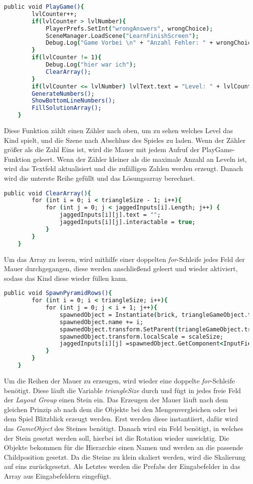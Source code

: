 \begin{lstlisting}[language=csh, caption={Triangle.cs PlayGame-Funktion}]
	public void PlayGame(){
		lvlCounter++;
		if(lvlCounter > lvlNumber){
			PlayerPrefs.SetInt("wrongAnswers", wrongChoice);
			SceneManager.LoadScene("LearnFinishScreen");
			Debug.Log("Game Vorbei \n" + "Anzahl Fehler: " + wrongChoice);
		}
		if(lvlCounter != 1){
			Debug.Log("hier war ich");
			ClearArray();
		}
		if(lvlCounter <= lvlNumber)	lvlText.text = "Level: " + lvlCounter + "/" + lvlNumber;
		GenerateNumbers();
		ShowBottomLineNumbers();
		FillSolutionArray();
	}
\end{lstlisting}
Diese Funktion zählt einen Zähler nach oben, um zu sehen welches Level das Kind spielt, und die Szene nach Abschluss des Spieles zu laden. Wenn der Zähler größer als die Zahl Eins ist, wird die Mauer mit jedem Aufruf der PlayGame-Funktion geleert. Wenn der Zähler kleiner als die maximale Anzahl an Leveln ist, wird das Textfeld aktualisiert und die zufälligen Zahlen werden erzeugt. Danach wird die unterste Reihe gefüllt und das Lösungsarray berechnet.
\begin{lstlisting}[language=csh, caption={Triangle.cs ClearArray-Funktion}]
	public void ClearArray(){
		for (int i = 0; i < triangleSize - 1; i++){
			for (int j = 0; j < jaggedInputs[i].Length; j++) {
				jaggedInputs[i][j].text = "";
				jaggedInputs[i][j].interactable = true;
			}
		}
	}
\end{lstlisting}
Um das Array zu leeren, wird mithilfe einer doppelten \textit{for}-Schleife jedes Feld der Mauer durchgegangen, diese werden anschließend geleert und wieder aktiviert, sodass das Kind diese wieder füllen kann.\\
\begin{lstlisting}[language=csh, caption={Triangle.cs SpawnPyramidRows-Funktion}]
	public void SpawnPyramidRows(){
		for (int i = 0; i < triangleSize; i++){
			for (int j = 0; j < i + 1; j++){
				spawnedObject = Instantiate(brick, triangleGameObject.transform.position, Quaternion.identity);
				spawnedObject.name += i;
				spawnedObject.transform.SetParent(triangleGameObject.transform.GetChild(i));
				spawnedObject.transform.localScale = scaleSize;
				jaggedInputs[i][j] =spawnedObject.GetComponent<InputField>();
			}
		}
	}
\end{lstlisting}
Um die Reihen der Mauer zu erzeugen, wird wieder eine doppelte \textit{for}-Schleife benötigt. Diese läuft die Variable \textit{triangleSize} durch und fügt in jedes freie Feld der \textit{Layout Group} einen Stein ein. Das Erzeugen der Mauer läuft nach dem gleichen Prinzip ab nach dem die Objekte bei den Mengenvergleichen oder bei dem Spiel Blitzblick erzeugt werden. Erst werden diese instantiiert, dafür wird das \textit{GameObject} des Steines benötigt. Danach wird ein Feld benötigt, in welches der Stein gesetzt werden soll, hierbei ist die Rotation wieder unwichtig. Die Objekte bekommen für die Hierarchie einen Namen und werden an die passende Childposition gesetzt. Da die Steine zu klein skaliert werden, wird die Skalierung auf eins zurückgesetzt. Als Letztes werden die Prefabs der Eingabefelder in das Array aus Eingabefeldern eingefügt.\\
